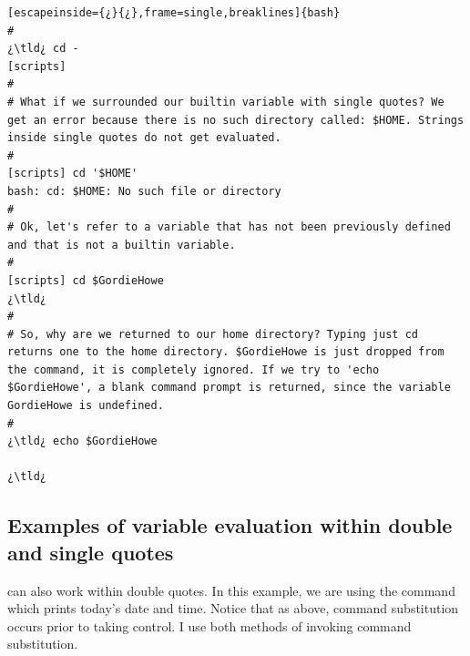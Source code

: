 \begin{lstlisting}[escapeinside={¿}{¿},frame=single,breaklines]{bash}
#
¿\tld¿ cd -
[scripts]
#
# What if we surrounded our builtin variable with single quotes? We get an error because there is no such directory called: $HOME. Strings inside single quotes do not get evaluated.
#
[scripts] cd '$HOME'
bash: cd: $HOME: No such file or directory
#
# Ok, let's refer to a variable that has not been previously defined and that is not a builtin variable.
#
[scripts] cd $GordieHowe
¿\tld¿
#
# So, why are we returned to our home directory? Typing just cd returns one to the home directory. $GordieHowe is just dropped from the command, it is completely ignored. If we try to 'echo $GordieHowe', a blank command prompt is returned, since the variable GordieHowe is undefined.
#
¿\tld¿ echo $GordieHowe

¿\tld¿
\end{lstlisting}

\subsection{Examples of variable evaluation within double and single quotes}

 can also work within double quotes. In this example, we are using the  command which prints today's date and time. Notice that as above, command substitution occurs prior to  taking control. I use both methods of invoking command substitution. 


